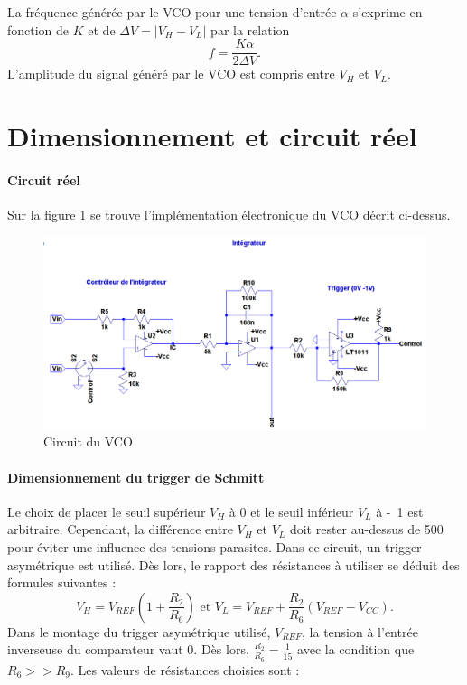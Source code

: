 La fréquence générée par le VCO pour une tension d'entrée $\alpha$ s'exprime 
en fonction de $K$ et de $\Delta V = \vert V_H - V_L\vert $ par la relation 
\[ f = \frac{K\alpha}{2\Delta V}. \]
L'amplitude du signal généré par le VCO est compris entre $V_H$ et $V_L$.


\section{Dimensionnement et circuit réel}
\paragraph{Circuit réel}
Sur la figure \ref{fig:circuit_vco} se trouve l'implémentation électronique du VCO décrit ci-dessus.

\begin{figure}[ht]
	\centering
	\includegraphics[scale=0.3]{img-vco/vco_circuit}
	\caption{Circuit du VCO}
	\label{fig:circuit_vco}
\end{figure}

\paragraph{Dimensionnement du trigger de Schmitt}
Le choix de placer le seuil supérieur $V_H$ à \unit{0}{\volt} 
et le seuil inférieur $V_L$ à \unit{-1}{\volt} est arbitraire. 
Cependant, la différence entre $V_H$ et $V_L$ doit rester au-dessus
de \unit{500}{\milli\volt} pour éviter une influence des tensions parasites.
Dans ce circuit, un trigger asymétrique est utilisé. Dès lors, le rapport
des résistances à utiliser se déduit des formules suivantes : 
\[ V_H = V_{REF}\left(1+\frac{R_2}{R_6}\right) \text{ et } V_L = V_{REF} + \frac{R_2}{R_6}\left(V_{REF}-V_{CC}\right). \]
Dans le montage du trigger asymétrique utilisé, $V_{REF}$, la tension à l'entrée
inverseuse du comparateur vaut \unit{0}{\volt}. Dès lors, $\frac{R_2}{R_6}=\frac{1}{15}$
avec la condition que $R_6 >> R_9$. Les valeurs de résistances choisies sont :

